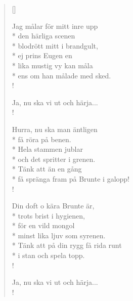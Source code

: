 \begin{verse}[\versewidth]

Jag målar för mitt inre upp\\*
den härliga scenen\\*
blodrött mitt i brandgult,\\*
ej prins Eugen en\\*
lika mustig vy kan måla\\*
ens om han målade med sked.\\!


Ja, nu ska vi ut och härja...\\!


Hurra, nu ska man äntligen\\*
få röra på benen.\\*
Hela stammen jublar\\*
och det spritter i grenen.\\*
Tänk att än en gång\\*
få spränga fram på Brunte i galopp!\\!


Din doft o kära Brunte är,\\*
trots brist i hygienen,\\*
för en vild mongol\\*
minst lika ljuv som syrenen.\\*
Tänk att på din rygg få rida runt\\*
i stan och spela topp.\\!


Ja, nu ska vi ut och härja...\\!




\end{verse}

